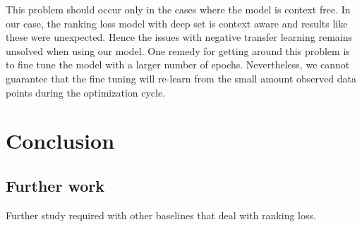 \documentclass[12pt, twoside, ngerman]{report}
\begin{document}
This problem should occur only in the cases where the model is context free.
In our case,  the ranking loss model with deep set is context aware and results like these were unexpected.
Hence the issues with negative transfer learning remains unsolved when using our model.
One remedy for getting around this problem is to fine tune the model with a larger number of epochs.
Nevertheless,  we cannot guarantee that the fine tuning will re-learn from the small amount observed data points during the optimization cycle.

\chapter{Conclusion}


\section{Further work}
Further study required with other baselines that deal with ranking loss.
\end{document}
